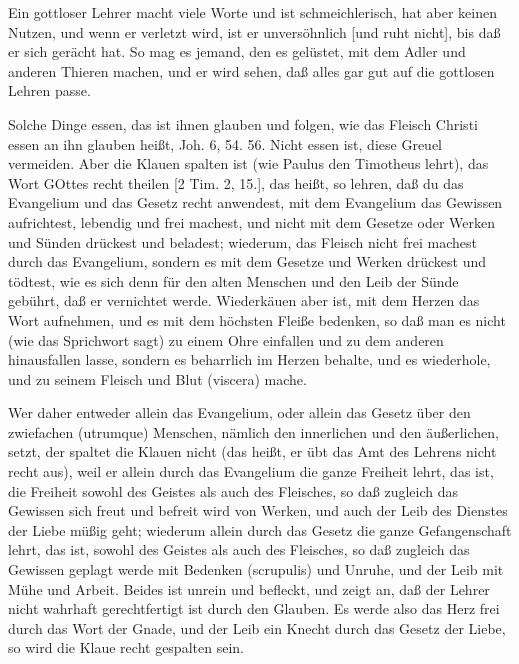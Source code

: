 Ein gottloser Lehrer macht viele Worte und ist schmeichlerisch, hat aber keinen Nutzen, und wenn er verletzt wird, ist er unversöhnlich [und ruht nicht], bis daß er sich gerächt hat. So mag es jemand, den es gelüstet, mit dem Adler und anderen Thieren machen, und er wird sehen, daß alles gar gut auf die gottlosen Lehren passe.

Solche Dinge essen, das ist ihnen glauben und folgen, wie das Fleisch Christi essen an ihn glauben heißt, Joh. 6, 54. 56. Nicht essen ist, diese Greuel vermeiden. Aber die Klauen spalten ist (wie Paulus den Timotheus lehrt), das Wort GOttes recht theilen [2 Tim. 2, 15.], das heißt, so lehren, daß du das Evangelium und das Gesetz recht anwendest, mit dem Evangelium das Gewissen aufrichtest, lebendig und frei machest, und nicht mit dem Gesetze oder Werken und Sünden drückest und beladest; wiederum, das Fleisch nicht frei machest durch das Evangelium, sondern es mit dem Gesetze und Werken drückest und tödtest, wie es sich denn für den alten Menschen und den Leib der Sünde gebührt, daß er vernichtet werde. Wiederkäuen aber ist, mit dem Herzen das Wort aufnehmen, und es mit dem höchsten Fleiße bedenken, so daß man es nicht (wie das Sprichwort sagt) zu einem Ohre einfallen und zu dem anderen hinausfallen lasse, sondern es beharrlich im Herzen behalte, und es wiederhole, und zu seinem Fleisch und Blut (viscera) mache.

Wer daher entweder allein das Evangelium, oder allein das Gesetz über den zwiefachen (utrumque) Menschen, nämlich den innerlichen und den äußerlichen, setzt, der spaltet die Klauen nicht (das heißt, er übt das Amt des Lehrens nicht recht aus), weil er allein durch das Evangelium die ganze Freiheit lehrt, das ist, die Freiheit sowohl des Geistes als auch des Fleisches, so daß zugleich das Gewissen sich freut und befreit wird von Werken, und auch der Leib des Dienstes der Liebe müßig geht; wiederum allein durch das Gesetz die ganze Gefangenschaft lehrt, das ist, sowohl des Geistes als auch des Fleisches, so daß zugleich das Gewissen geplagt werde mit Bedenken (scrupulis) und Unruhe, und der Leib mit Mühe und Arbeit. Beides ist unrein und befleckt, und zeigt an, daß der Lehrer nicht wahrhaft gerechtfertigt ist durch den Glauben. Es werde also das Herz frei durch das Wort der Gnade, und der Leib ein Knecht
durch das Gesetz der Liebe, so wird die Klaue recht gespalten sein.

